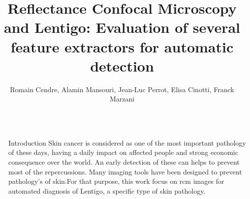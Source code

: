 \documentclass[final]{beamer}
\title{Reflectance Confocal Microscopy and Lentigo: Evaluation of several feature extractors for automatic detection} %
\author{Romain Cendre, Alamin Mansouri, Jean-Luc Perrot, Elisa Cinotti, Franck Marzani}
\institute{Laboratoire ImViA, EA 7535, Universite de Bourgogne, Dijon, France} %
\newlength{\sepmargin}
\newlength{\onecolwid}
\begin{document}
    \setlength{\belowcaptionskip}{2ex} %
    \setlength\belowdisplayshortskip{1ex} %
  
  
    \begin{frame}[t] %
    \begin{columns}[t] %
        \begin{column}{\sepmargin}\end{column} %
        
        \begin{column}{\onecolwid} %
            \begin{block}{Introduction}
                \justifying
                Skin cancer is considered as one of the most important pathology of these days, having a daily impact on affected people and strong economic consequence over the world. An early detection of these can helps to prevent most of the repercussions. Many imaging tools have been designed to prevent pathology's of skin.For that purpose, this work focus on \ac{rcm} images for automated diagnosis of Lentigo, a specific type of skin pathology.
               

\end{block}
\end{column}
\end{columns}
\end{frame}
\end{document}
